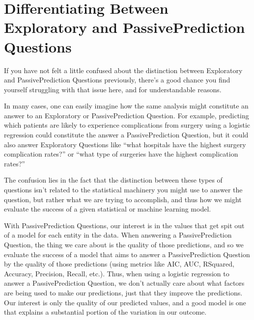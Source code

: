 \documentclass[letterpaper,10pt,english]{jupyterBook}
\begin{document}
\section{Differentiating Between Exploratory and Passive\sphinxhyphen{}Prediction Questions}
\label{\detokenize{30_questions/20_passive_prediction_questions:differentiating-between-exploratory-and-passive-prediction-questions}}
\sphinxAtStartPar
If you have not felt a little confused about the distinction between Exploratory and Passive\sphinxhyphen{}Prediction Questions previously, there’s a good chance you find yourself struggling with that issue here, and for understandable reasons.

\sphinxAtStartPar
In many cases, one can easily imagine how the same analysis might constitute an answer to  an Exploratory or Passive\sphinxhyphen{}Prediction Question. For example, predicting which patients are likely to experience complications from surgery using a logistic regression could constitute the answer a Passive\sphinxhyphen{}Prediction Question, but it could also answer Exploratory Questions like “what hospitals have the highest surgery complication rates?” or “what type of surgeries have the highest complication rates?”

\sphinxAtStartPar
The confusion lies in the fact that the distinction between these types of questions isn’t related to the statistical machinery you might use to answer the question, but rather what we are trying to accomplish, and thus how we might evaluate the success of a given statistical or machine learning model.

\sphinxAtStartPar
With Passive\sphinxhyphen{}Prediction Questions, our interest is in the values that get spit out of a model for each entity in the data. When answering a Passive\sphinxhyphen{}Prediction Question, the  thing we care about is the quality of those predictions, and so we evaluate the success of a model that aims to answer a Passive\sphinxhyphen{}Prediction Question by the quality of those predictions (using metrics like AIC, AUC, R\sphinxhyphen{}Squared, Accuracy, Precision, Recall, etc.). Thus, when using a logistic regression to answer a Passive\sphinxhyphen{}Prediction Question, we don’t actually care about what factors are being used to make our predictions, just that they improve the predictions. Our interest is only the quality of our predicted values, and a good model is one that explains a substantial portion of the variation in our outcome.
\end{document}
